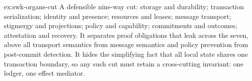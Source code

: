 \documentclass[11pt,a4paper]{article}
\theoremstyle{definition}
\theoremstyle{remark}
\begin{document}
\begin{pdsolution}{ex:swk-organs-cut}
A defensible nine-way cut: storage and durability; transaction serialization; identity and presence; resources and leases; message transport; stigmergy and projections; policy and capability; commitments and outcomes; attestation and recovery. It separates proof obligations that leak across the seven, above all transport semantics from message semantics and policy prevention from post-commit detection. It hides the simplifying fact that all local state shares one transaction boundary, so any such cut must retain a cross-cutting invariant: one ledger, one effect mediator.
\end{pdsolution}

\end{document}
